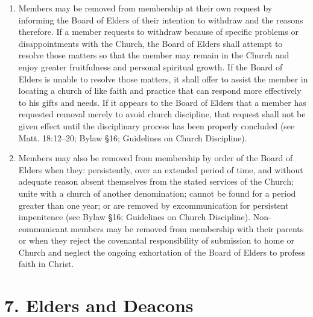 \documentclass[
]{book}
\begin{document}
\begin{enumerate}
\item
  Members may be removed from membership at their own request by informing the Board of Elders of their intention to withdraw and the reasons therefore. If a member requests to withdraw because of specific problems or disappointments with the Church, the Board of Elders shall attempt to resolve those matters so that the member may remain in the Church and enjoy greater fruitfulness and personal spiritual growth. If the Board of Elders is unable to resolve those matters, it shall offer to assist the member in locating a church of like faith and practice that can respond more effectively to his gifts and needs. If it appears to the Board of Elders that a member has requested removal merely to avoid church discipline, that request shall not be given effect until the disciplinary process has been properly concluded (see Matt. 18:12--20; Bylaw §16; Guidelines on Church Discipline).
\item
  Members may also be removed from member­ship by order of the Board of Elders when they: persis­tently, over an extended period of time, and without adequate reason absent themselves from the stated services of the Church; unite with a church of another denomination; cannot be found for a period greater than one year; or are removed by excommunication for persistent impenitence (see Bylaw §16; Guidelines on Church Discipline). Non-communicant members may be removed from membership with their parents or when they reject the covenantal responsibility of submission to home or Church and neglect the ongoing exhort­a­tion of the Board of Elders to profess faith in Christ.
\end{enumerate}

\hypertarget{elders-and-deacons}{%
\section{7. Elders and Deacons}\label{elders-and-deacons}}
\end{document}

